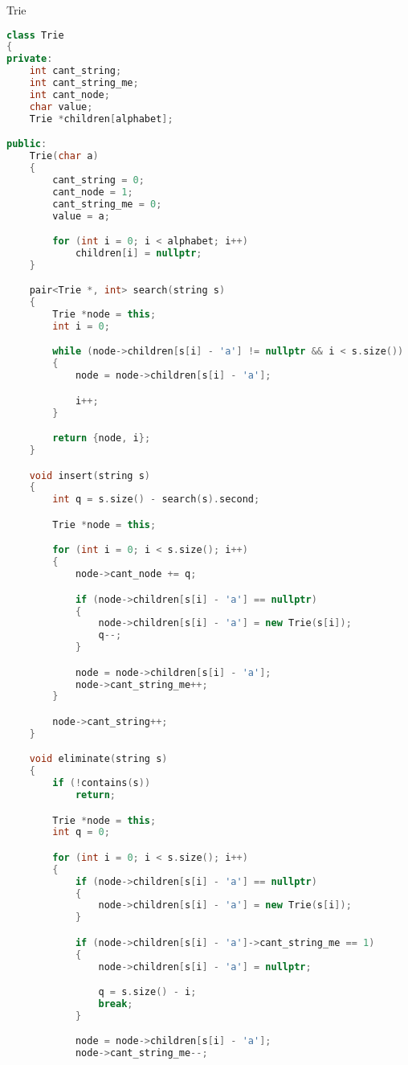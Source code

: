 \documentclass[leter]{amsart}
\begin{document}
Trie
\begin{multicols}{2}
\begin{lstlisting}[language=C++]
class Trie
{
private:
    int cant_string;
    int cant_string_me;
    int cant_node;
    char value;
    Trie *children[alphabet];

public:
    Trie(char a)
    {
        cant_string = 0;
        cant_node = 1;
        cant_string_me = 0;
        value = a;

        for (int i = 0; i < alphabet; i++)
            children[i] = nullptr;
    }

    pair<Trie *, int> search(string s)
    {
        Trie *node = this;
        int i = 0;

        while (node->children[s[i] - 'a'] != nullptr && i < s.size())
        {
            node = node->children[s[i] - 'a'];

            i++;
        }

        return {node, i};
    }

    void insert(string s)
    {
        int q = s.size() - search(s).second;

        Trie *node = this;

        for (int i = 0; i < s.size(); i++)
        {
            node->cant_node += q;

            if (node->children[s[i] - 'a'] == nullptr)
            {
                node->children[s[i] - 'a'] = new Trie(s[i]);
                q--;
            }

            node = node->children[s[i] - 'a'];
            node->cant_string_me++;
        }

        node->cant_string++;
    }

    void eliminate(string s)
    {
        if (!contains(s))
            return;

        Trie *node = this;
        int q = 0;

        for (int i = 0; i < s.size(); i++)
        {
            if (node->children[s[i] - 'a'] == nullptr)
            {
                node->children[s[i] - 'a'] = new Trie(s[i]);
            }

            if (node->children[s[i] - 'a']->cant_string_me == 1)
            {
                node->children[s[i] - 'a'] = nullptr;

                q = s.size() - i;
                break;
            }

            node = node->children[s[i] - 'a'];
            node->cant_string_me--;


\end{lstlisting}
\end{multicols}
\end{document}
